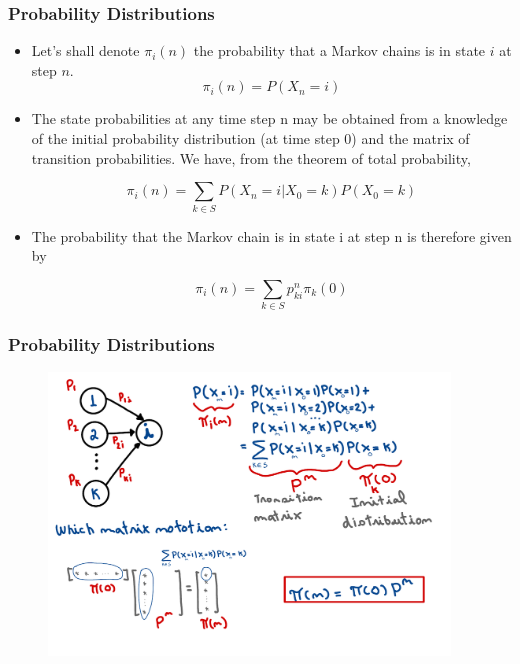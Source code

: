 \begin{frame}
    \frametitle{Probability Distributions}
        \begin{itemize}
            \item Let's shall denote $\pi_i(n)$ the probability that a Markov chains is in state $i$ at step $n$.
            $$\pi_i(n) = P(X_n = i)$$

            \item The state probabilities at any time step n may be obtained from a knowledge of the initial 
            probability distribution (at time step 0) and the matrix of transition probabilities. We have, from 
            the theorem of total probability,
            \small

            $$\pi_i(n) = \sum_{k\in S} P(X_n = i| X_0 = k)P(X_0 = k) $$

            \item The probability that the Markov chain is in state i at step n is therefore given by

            $$\pi_i(n) = \sum_{k\in S} p_{ki}^n\pi_k(0)$$
        \end{itemize}
\end{frame}

\begin{frame}
    \frametitle{Probability Distributions}
        \begin{figure}
            \centering
            \includegraphics[width=0.95\textwidth]{slides/figures/pi_dist_proof.pdf}
        \end{figure}
\end{frame}


